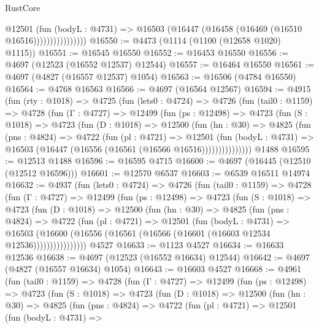 \begin{lexlean}{RustCore}
\begin{coremodule}
                        @12501
                          (fun (bodyL : @4731) =>
                          @16503 (@16447 (@16458 (@16469 (@16510 @16516))))))))))))))))
@16550 := @4473 (@1114 (@1100 (@12658 @1020) @1115))
@16551 := @16545 @16550
@16552 := @16453 @16550
@16556 := @4697 (@12523 (@16552 @12537) @12544)
@16557 := @16464 @16550
@16561 := @4697 (@4827 (@16557 @12537) @1054)
@16563 := @16506 (@4784 @16550)
@16564 := @4768 @16563
@16566 := @4697 (@16564 @12567)
@16594 := @4915
    (fun (rty : @1018) =>
    @4725
      (fun (lets0 : @4724) =>
      @4726
        (fun (tail0 : @1159) =>
        @4728
          (fun (Γ : @4727) =>
          @12499
            (fun (ps : @12498) =>
            @4723
              (fun (S : @1018) =>
              @4723
                (fun (D : @1018) =>
                @12500
                  (fun (hn : @30) =>
                  @4825
                    (fun (pns : @4824) =>
                    @4722
                      (fun (pl : @4721) =>
                      @12501
                        (fun (bodyL : @4731) =>
                        @16503 (@16447 (@16556 (@16561 (@16566 @16516)))))))))))))))
    @1488
@16595 := @12513 @1488
@16596 := @16595 @4715
@16600 := @4697 (@16445 (@12510 (@12512 @16596)))
@16601 := @12570 @6537
@16603 := @6539 @16511 @14974
@16632 := @4937
    (fun (lets0 : @4724) =>
    @4726
      (fun (tail0 : @1159) =>
      @4728
        (fun (Γ : @4727) =>
        @12499
          (fun (ps : @12498) =>
          @4723
            (fun (S : @1018) =>
            @4723
              (fun (D : @1018) =>
              @12500
                (fun (hn : @30) =>
                @4825
                  (fun (pns : @4824) =>
                  @4722
                    (fun (pl : @4721) =>
                    @12501
                      (fun (bodyL : @4731) =>
                      @16503
                        (@16600
                          (@16556 (@16561 (@16566 (@16601 (@16603 @12534 @12536))))))))))))))))
    @4527
@16633 := @1123 @4527
@16634 := @16633 @12536
@16638 := @4697 (@12523 (@16552 @16634) @12544)
@16642 := @4697 (@4827 (@16557 @16634) @1054)
@16643 := @16603 @4527
@16668 := @4961
    (fun (tail0 : @1159) =>
    @4728
      (fun (Γ : @4727) =>
      @12499
        (fun (ps : @12498) =>
        @4723
          (fun (S : @1018) =>
          @4723
            (fun (D : @1018) =>
            @12500
              (fun (hn : @30) =>
              @4825
                (fun (pns : @4824) =>
                @4722
                  (fun (pl : @4721) =>
                  @12501
                    (fun (bodyL : @4731) =>

\end{coremodule}
\end{lexlean}
